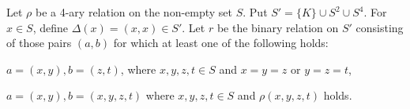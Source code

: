 Let $\rho$ be a 4-ary relation on the non-empty set $S$. Put $S' = \{K\} \cup S^2 \cup S^4$. For $x \in S$, define $\Delta(x) = (x, x) \in S'$. Let $r$ be the binary relation on $S'$ consisting of those pairs $(a, b)$ for which at least one of the following holds:

 $a = (x, y), b = (z, t)$, where $x, y, z, t \in S$ and $x = y = z$ or $y = z = t$,

 $a = (x, y), b = (x, y, z, t)$ where $x, y, z, t \in S$ and $\rho(x, y, z, t)$ holds.
